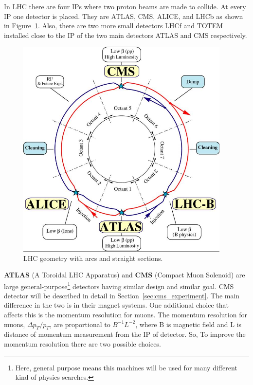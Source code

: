 In LHC there are four IPs where two proton beams are made to collide. At every IP one detector is placed. They are ATLAS, CMS, ALICE, and LHCb as shown in Figure~\ref{fig:LHCgeometry}. Also, there are two more small detectors LHCf and TOTEM installed close to the IP of the two main detectors ATLAS and CMS respectively.
\begin{figure}[!htbp]
	\centering
	\includegraphics[width=0.95\textwidth]{figures/LHC/lhc-schematic.jpg}
	\caption{LHC geometry with arcs and straight sections.}
	\label{fig:LHCgeometry}
\end{figure}
\newline
{\bf ATLAS} (A Toroidal LHC Apparatus) and {\bf CMS} (Compact Muon Solenoid) are large general-purpose\footnote{Here, general purpose means this machines will be used for many different kind of physics searches.} detectors having similar design and similar goal. CMS detector will be described in detail in Section~\ref{sec:cms_experiment}. The main difference in the two is in their magnet systems. One additional choice that affects this is the momentum resolution for muons. The momentum resolution for muons, $\Delta p_T/p_T$, are proportional to  $B^{-1}L^{-2}$, where B is magnetic field and L is distance of momentum measurement from the IP of detector. So, To improve the momentum resolution there are two possible choices.

